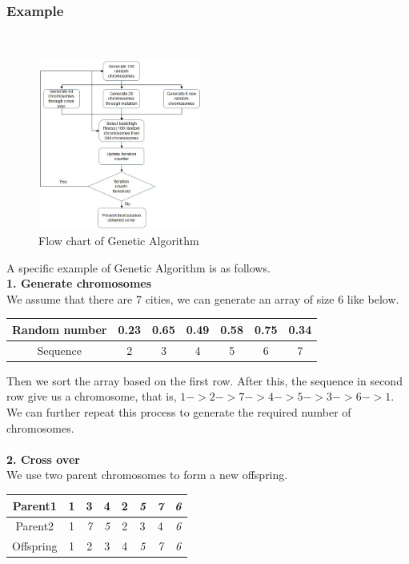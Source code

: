 \subsubsection{Example}
\hfill\\
\begin{figure}
    \centering
    \includegraphics[width=0.48\textwidth]{flowchart}
    \caption{Flow chart of Genetic Algorithm}
    \label{fig: GA}
\end{figure}
A specific example of Genetic Algorithm is as follows\cite{TutorialGA}.\\
\textbf{1. Generate chromosomes}\\
We assume that there are 7 cities, we can generate an array of size 6 like below.\\
\begin{center}
\begin{tabular}{ |c|c|c|c|c|c|c| }
\hline
 Random number&0.23&0.65&0.49&0.58&0.75&0.34 \\
 \hline
 Sequence & 2 & 3& 4& 5& 6& 7 \\ 
 \hline
\end{tabular}
\end{center}
Then we sort the array based on the first row. After this, the sequence in second row give us a chromosome, that is, $1->2->7->4->5->3->6->1$.\\
We can further repeat this process to generate the required number of chromosomes.\\
\hfill\\
\textbf{2. Cross over}\\
We use two parent chromosomes to form a new offspring.\\
\begin{center}
\begin{tabular}{|c|c|c|c|c|c|c|c|}
\hline
Parent1 & 1& 3& 4& 2& \emph{5}& \emph{7}& \emph{6} \\
\hline
Parent2 & 1& \emph{7}& \emph{5}& 2& 3& 4& \emph{6} \\
\hline
Offspring & 1& 2& 3& 4& \emph{5}& \emph{7}&\emph{6}\\
\hline
\end{tabular}
\end{center}
